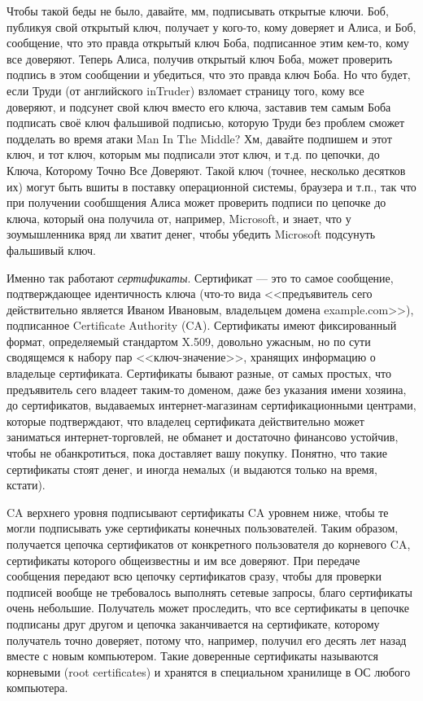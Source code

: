 \documentclass{../../text-style}
\begin{document}
Чтобы такой беды не было, давайте, мм, подписывать открытые ключи. Боб, публикуя свой открытый ключ, получает у кого-то, кому доверяет и Алиса, и Боб, сообщение, что это правда открытый ключ Боба, подписанное этим кем-то, кому все доверяют. Теперь Алиса, получив открытый ключ Боба, может проверить подпись в этом сообщении и убедиться, что это правда ключ Боба. Но что будет, если Труди (от английского inTruder) взломает страницу того, кому все доверяют, и подсунет свой ключ вместо его ключа, заставив тем самым Боба подписать своё ключ фальшивой подписью, которую Труди без проблем сможет подделать во время атаки Man In The Middle? Хм, давайте подпишем и этот ключ, и тот ключ, которым мы подписали этот ключ, и т.д. по цепочки, до Ключа, Которому Точно Все Доверяют. Такой ключ (точнее, несколько десятков их) могут быть вшиты в поставку операционной системы, браузера и т.п., так что при получении сообшщения Алиса может проверить подписи по цепочке до ключа, который она получила от, например, Microsoft, и знает, что у зоумышленника вряд ли хватит денег, чтобы убедить Microsoft подсунуть фальшивый ключ.

Именно так работают \textit{сертификаты}. Сертификат --- это то самое сообщение, подтверждающее идентичность ключа (что-то вида <<предъявитель сего действительно является Иваном Ивановым, владельцем домена example.com>>), подписанное Certificate Authority (CA). Сертификаты имеют фиксированный формат, определяемый стандартом X.509, довольно ужасным, но по сути сводящемся к набору пар <<ключ-значение>>, хранящих информацию о владельце сертификата. Сертификаты бывают разные, от самых простых, что предъявитель сего владеет таким-то доменом, даже без указания имени хозяина, до сертификатов, выдаваемых интернет-магазинам сертификационными центрами, которые подтверждают, что владелец сертификата действительно может заниматься интернет-торговлей, не обманет и достаточно финансово устойчив, чтобы не обанкротиться, пока доставляет вашу покупку.  Понятно, что такие сертификаты стоят денег, и иногда немалых (и выдаются только на время, кстати).

CA верхнего уровня подписывают сертификаты CA уровнем ниже, чтобы те могли подписывать уже сертификаты конечных пользователей. Таким образом, получается цепочка сертификатов от конкретного пользователя до корневого CA, сертификаты которого общеизвестны и им все доверяют. При передаче сообщения передают всю цепочку сертификатов сразу, чтобы для проверки подписей вообще не требовалось выполнять сетевые запросы, благо сертификаты очень небольшие. Получатель может проследить, что все сертификаты в цепочке подписаны друг другом и цепочка заканчивается на сертификате, которому получатель точно доверяет, потому что, например, получил его десять лет назад вместе с новым компьютером. Такие доверенные сертификаты называются корневыми (root certificates) и хранятся в специальном хранилище в ОС любого компьютера.
\end{document}
